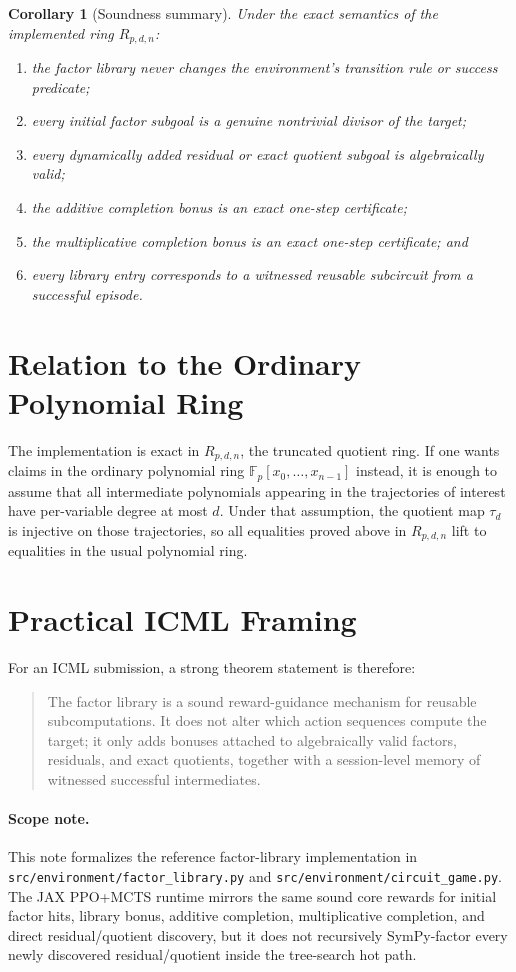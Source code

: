\documentclass[11pt]{article}
\newtheorem{corollary}[theorem]{Corollary}
\theoremstyle{remark}
\newcommand{\Fp}{\mathbb{F}_p}
\begin{document}
\begin{corollary}[Soundness summary]
Under the exact semantics of the implemented ring $R_{p,d,n}$:
\begin{enumerate}[leftmargin=2em]
\item the factor library never changes the environment's transition rule or
success predicate;
\item every initial factor subgoal is a genuine nontrivial divisor of the
target;
\item every dynamically added residual or exact quotient subgoal is
algebraically valid;
\item the additive completion bonus is an exact one-step certificate;
\item the multiplicative completion bonus is an exact one-step certificate; and
\item every library entry corresponds to a witnessed reusable subcircuit from a
successful episode.
\end{enumerate}
\end{corollary}

\section{Relation to the Ordinary Polynomial Ring}

The implementation is exact in $R_{p,d,n}$, the truncated quotient ring.
If one wants claims in the ordinary polynomial ring $\Fp[x_0,\dots,x_{n-1}]$
instead, it is enough to assume that all intermediate polynomials appearing in
the trajectories of interest have per-variable degree at most $d$. Under that
assumption, the quotient map $\tau_d$ is injective on those trajectories, so
all equalities proved above in $R_{p,d,n}$ lift to equalities in the usual
polynomial ring.

\section{Practical ICML Framing}

For an ICML submission, a strong theorem statement is therefore:
\begin{quote}
The factor library is a sound reward-guidance mechanism for reusable
subcomputations. It does not alter which action sequences compute the target;
it only adds bonuses attached to algebraically valid factors, residuals, and
exact quotients, together with a session-level memory of witnessed successful
intermediates.
\end{quote}

\paragraph{Scope note.}
This note formalizes the reference factor-library implementation in
\texttt{src/environment/factor\_library.py} and
\texttt{src/environment/circuit\_game.py}. The JAX PPO+MCTS runtime mirrors the
same sound core rewards for initial factor hits, library bonus, additive
completion, multiplicative completion, and direct residual/quotient discovery,
but it does not recursively SymPy-factor every newly discovered
residual/quotient inside the tree-search hot path.
\end{document}

